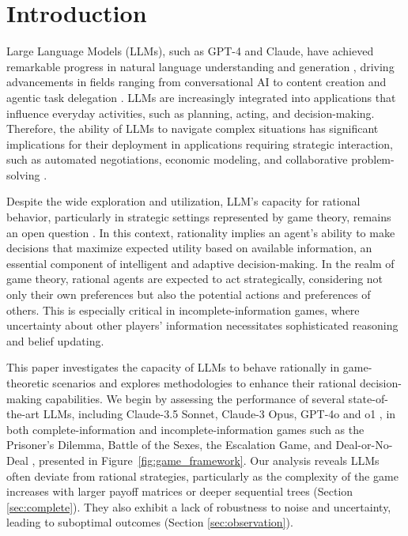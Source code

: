 \section{Introduction}
Large Language Models (LLMs), such as GPT-4 and Claude, have achieved remarkable progress in natural language understanding and generation \cite{zhang2024supervised, ding2024hybrid, fang2024large}, driving advancements in fields ranging from conversational AI \cite{dam2024complete, dong2023towards} to content creation \cite{liang2024monitoring, shao2024assisting} and agentic task delegation \cite{guo2024embodied, agashe2023evaluating, xi2023rise}. LLMs are increasingly integrated into applications that influence everyday activities, such as planning, acting, and decision-making. Therefore, the ability of LLMs to navigate complex situations has significant implications for their deployment in applications requiring strategic interaction, such as automated negotiations, economic modeling, and collaborative problem-solving \cite{bianchi2024well, horton2023large, li2024econagent, chen2024comm, li2023metaagents}.

Despite the wide exploration and utilization, LLM's capacity for rational behavior, particularly in strategic settings represented by game theory, remains an open question \cite{leng2023llm, stade2024large, wu2024shall, de2023emergent, lan2023llm}. In this context, rationality implies an agent’s ability to make decisions that maximize expected utility based on available information, an essential component of intelligent and adaptive decision-making. In the realm of game theory, rational agents are expected to act strategically, considering not only their own preferences but also the potential actions and preferences of others. This is especially critical in incomplete-information games, where uncertainty about other players' information necessitates sophisticated reasoning and belief updating. 

This paper investigates the capacity of LLMs to behave rationally in game-theoretic scenarios and explores methodologies to enhance their rational decision-making capabilities. We begin by assessing the performance of several state-of-the-art LLMs, including Claude-3.5 Sonnet, Claude-3 Opus, GPT-4o and o1 \cite{zhong2024evaluation}, in both complete-information and incomplete-information games such as the Prisoner's Dilemma, Battle of the Sexes, the Escalation Game, and Deal-or-No-Deal \cite{lewis2017deal}, presented in Figure~\ref{fig:game_framework}. Our analysis reveals LLMs often deviate from rational strategies, particularly as the complexity of the game increases with larger payoff matrices or deeper sequential trees (Section \ref{sec:complete}). They also exhibit a lack of robustness to noise and uncertainty, leading to suboptimal outcomes (Section \ref{sec:observation}).

